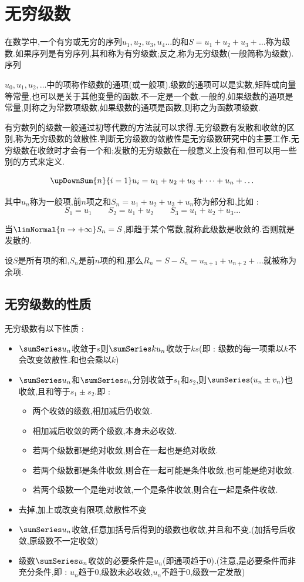 \section{无穷级数}{
在数学中,一个有穷或无穷的序列$u_{1},u_{2},u_{3},u_{4}\ldots$的和$S=u_{1}+u_{2}+u_{3}+\ldots$称为级数.如果序列是有穷序列,其和称为有穷级数;反之,称为无穷级数(一般简称为级数).序列{$u_{0},u_{1},u_{2},\ldots$中的项称作级数的通项(或一般项).级数的通项可以是实数,矩阵或向量等常量,也可以是关于其他变量的函数,不一定是一个数.一般的,如果级数的通项是常量,则称之为常数项级数,如果级数的通项是函数,则称之为函数项级数.

有穷数列的级数一般通过初等代数的方法就可以求得.无穷级数有发散和收敛的区别,称为无穷级数的敛散性.判断无穷级数的敛散性是无穷级数研究中的主要工作.无穷级数在收敛时才会有一个和;发散的无穷级数在一般意义上没有和,但可以用一些别的方式来定义.

$$
  \upDownSum{n}{i = 1}u_i = u_1 + u_2 + u_3 + \dots + u_n +  \dots
$$

其中$u_n$称为一般项,前$n$项之和$S_n = u_1 + u_2 + u_3 + u_n$称为部分和,比如 :
$$
  S_1 = u_1\qquad S_2 = u_1 + u_2\qquad S_3 = u_1 + u_2 + u_3 \dots
$$

当$\limNormal{n \to +\infty}S_n = S$,即趋于某个常数,就称此级数是收敛的.否则就是发散的.

设$S$是所有项的和,$S_n$是前$n$项的和,那么$R_n = S - S_n = u_{n+1} + u_{n + 2} + \dots$就被称为余项.

\subsection{无穷级数的性质}{
  无穷级数有以下性质 :
  \begin{itemize}
    \item $\sumSeries u_n$收敛于$s$则$\sumSeries ku_n$收敛于$ks$(即 : 级数的每一项乘以$k$不会改变敛散性.和也会乘以$k$)
    \item {
          $\sumSeries u_n$和$\sumSeries v_n$分别收敛于$s_1$和$s_2$,则$\sumSeries (u_n \pm v_n)$也收敛,且和等于$s_1 \pm s_2$.即 :
          \begin{itemize}
            \item 两个收敛的级数,相加减后仍收敛.
            \item 相加减后收敛的两个级数,本身未必收敛.
            \item 若两个级数都是绝对收敛,则合在一起也是绝对收敛.
            \item 若两个级数都是条件收敛,则合在一起可能是条件收敛,也可能是绝对收敛.
            \item 若两个级数一个是绝对收敛,一个是条件收敛,则合在一起是条件收敛.
          \end{itemize}
          }
    \item 去掉,加上或改变有限项,敛散性不变
    \item $\sumSeries u_n$收敛,任意加括号后得到的级数也收敛,并且和不变.(加括号后收敛,原级数不一定收敛)
    \item 级数$\sumSeries u_n$收敛的必要条件是$u_n$(即通项趋于0).(注意,是必要条件而非充分条件,即 : $u_n$趋于0,级数未必收敛,$u_n$不趋于0,级数一定发散)
  \end{itemize}
}%

}}
